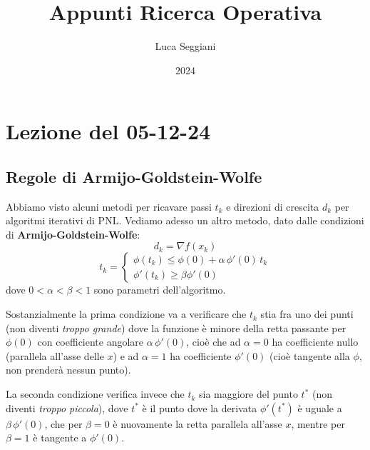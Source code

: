 \documentclass[a4paper,11pt]{article}
\title{Appunti Ricerca Operativa}
\author{Luca Seggiani}
\date{2024}
\begin{document}
\section{Lezione del 05-12-24}

\thispagestyle{empty}
\pagestyle{fancy}


\subsection{Regole di Armijo-Goldstein-Wolfe}
Abbiamo visto alcuni metodi per ricavare passi $t_k$ e direzioni di crescita $d_k$ per algoritmi iterativi di PNL.
Vediamo adesso un altro metodo, dato dalle condizioni di \textbf{Armijo-Goldstein-Wolfe}:
$$
d_k = \nabla f(x_k)
$$
$$
t_k =
\begin{cases}
	\phi(t_k) \leq \phi(0) + \alpha \, \phi'(0) \, t_k \\ 
	\phi'(t_k) \geq \beta \phi'(0)
\end{cases}
$$
dove $0 < \alpha < \beta < 1$ sono parametri dell'algoritmo.

Sostanzialmente la prima condizione va a verificare che $t_k$ stia fra uno dei punti (non diventi \textit{troppo grande}) dove la funzione è minore della retta passante per $\phi(0)$ con coefficiente angolare $\alpha \, \phi'(0)$, cioè che ad $\alpha = 0$ ha coefficiente nullo (parallela all'asse delle $x$) e ad $\alpha = 1$ ha coefficiente $\phi'(0)$ (cioè tangente alla $\phi$, non prenderà nessun punto).

La seconda condizione verifica invece che $t_k$ sia maggiore del punto $t^*$ (non diventi \textit{troppo piccola}), dove $t^*$ è il punto dove la derivata $\phi'(t^*)$ è uguale a $\beta \, \phi'(0)$, che per $\beta = 0$ è nuovamente la retta parallela all'asse $x$, mentre per $\beta = 1$ è tangente a $\phi'(0)$. 

\begin{center}

\end{center}
\end{document}
